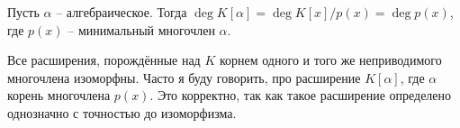 {\crl Пусть $\alpha$ -- алгебраическое. Тогда $\deg K[\alpha]= \deg K[x]/p(x)= \deg p(x)$, где $p(x)$ -- минимальный многочлен $\alpha$.
\ecrl

\crl Все расширения, порождённые над $K$ корнем одного и того же неприводимого многочлена изоморфны. Часто я буду говорить, про расширение $K[\alpha]$, где $\alpha$ корень многочлена $p(x)$. Это корректно, так как такое расширение определено однозначно с точностью до изоморфизма.
\ecrl
}
